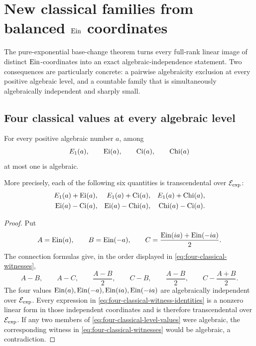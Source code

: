 \section{New classical families from balanced \texorpdfstring{\(\operatorname{Ein}\)}{Ein} coordinates}
\label{sec:new-classical-families}

The pure-exponential base-change theorem turns every full-rank linear image
of distinct \(\operatorname{Ein}\)-coordinates into an exact algebraic-independence
statement.  Two consequences are particularly concrete: a pairwise
algebraicity exclusion at every positive algebraic level, and a countable
family that is simultaneously algebraically independent and sharply small.

\subsection{Four classical values at every algebraic level}

\begin{theorem}
\label{thm:four-classical-algebraic-level}
For every positive algebraic number \(a\), among
\begin{equation}\label{eq:four-classical-level-values}
 E_1(a),\qquad \operatorname{Ei}(a),\qquad \operatorname{Ci}(a),\qquad \operatorname{Chi}(a)
\end{equation}
at most one is algebraic.

More precisely, each of the following six quantities is transcendental over
\(\mathcal E_{\mathrm{exp}}\):
\begin{align}
 E_1(a)+\operatorname{Ei}(a),& & E_1(a)+\operatorname{Ci}(a),& & E_1(a)+\operatorname{Chi}(a),\notag\\
 \operatorname{Ei}(a)-\operatorname{Ci}(a),& & \operatorname{Ei}(a)-\operatorname{Chi}(a),& & \operatorname{Chi}(a)-\operatorname{Ci}(a).
 \label{eq:four-classical-witnesses}
\end{align}
\end{theorem}

\begin{proof}
Put
\[
 A=\operatorname{Ein}(a),\qquad B=\operatorname{Ein}(-a),\qquad
 C=\frac{\operatorname{Ein}(ia)+\operatorname{Ein}(-ia)}2.
\]
The connection formulas give, in the order displayed in
\eqref{eq:four-classical-witnesses},
\begin{equation}\label{eq:four-classical-witness-identities}
 A-B,\qquad A-C,\qquad \frac{A-B}{2},\qquad
 C-B,\qquad \frac{A-B}{2},\qquad
 C-\frac{A+B}{2}.
\end{equation}
The four values
\(\operatorname{Ein}(a),\operatorname{Ein}(-a),\operatorname{Ein}(ia),\operatorname{Ein}(-ia)\) are algebraically independent
over \(\mathcal E_{\mathrm{exp}}\).  Every expression in
\eqref{eq:four-classical-witness-identities} is a nonzero linear form in
those independent coordinates and is therefore transcendental over
\(\mathcal E_{\mathrm{exp}}\).  If any two members of
\eqref{eq:four-classical-level-values} were algebraic, the corresponding
witness in \eqref{eq:four-classical-witnesses} would be algebraic, a
contradiction.
\end{proof}

